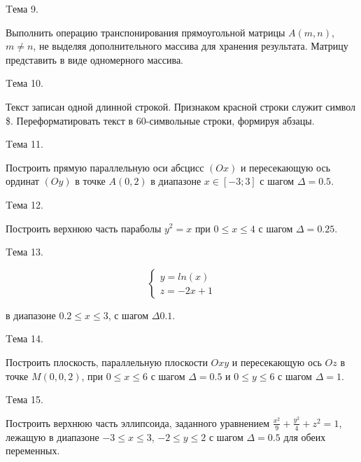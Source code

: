 \documentclass[12pt, a4paper]{article}
\begin{document}
\begin{flushleft}
		{Tема 9. \par Выполнить операцию транспонирования прямоугольной матрицы
		$A(m,n)$, $m\neq n$, не выделяя дополнительного массива для хранения
		результата. Матрицу представить в виде одномерного массива.} \par
		{Tема 10. \par Текст записан одной длинной строкой. Признаком красной строки
		служит символ \$. Переформатировать текст в 60-символьные строки,
		формируя абзацы.} \par
		{Tема 11. \par Построить прямую параллельную оси абсцисс $(Ox)$ и пересекающую
		ось ординат $(Oy)$ в точке $A(0,2)$ в диапазоне $x\in [-3;3]$ с шагом $\Delta =0.5$.} \par
		{Tема 12. \par Построить верхнюю часть параболы $y^2=x$ при $0\leq x \leq 4$ с шагом $\Delta =0.25$.} \par
		{Tема 13. \par 
		\begin{equation*} 
			\begin{cases} 
				y=ln(x)
				\\
				z=-2x+1
			\end{cases} 
		\end{equation*}
		\begin{center}в диапазоне $0.2\leq x\leq 3$, с шагом $\Delta 0.1$.\end{center}} \par
		{Tема 14. \par Построить плоскость, параллельную плоскости $Oxy$ и пересекающую ось $Oz$
		в точке $M(0,0,2)$, при $0\leq x\leq 6$ с шагом $\Delta =0.5$ и $0\leq y\leq 6$
		с шагом $\Delta =1$.} \par
		{Tема 15. \par Построить верхнюю часть эллипсоида, заданного уравнением 
		$\frac{x^2}{9}+\frac{y^2}{4}+z^2=1$, лежащую в диапазоне $-3\leq x\leq 3$, $-2\leq y\leq 2$ с 
		шагом $\Delta =0.5$ для обеих переменных.} \par
	\end{flushleft}
\end{document}
